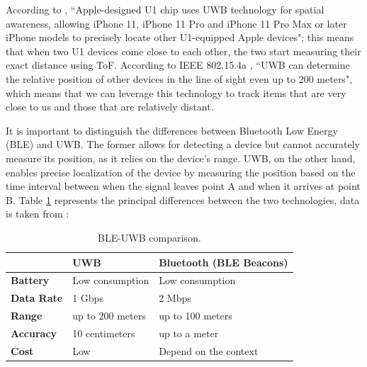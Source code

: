 \documentclass[english]{article}
\begin{document}
According to \cite{aps}, ``Apple-designed U1 chip uses UWB technology for spatial awareness, allowing iPhone 11, iPhone 11 Pro and iPhone 11 Pro Max or later iPhone models to precisely locate other U1-equipped Apple devices"; this means that when two U1 devices come close to each other, the two start measuring their exact distance using ToF. According to IEEE 802.15.4a \cite{5394030}, ``UWB can determine the relative position of other devices in the line of sight even up to 200 meters", which means that we can leverage this technology to track items that are very close to us and those that are relatively distant.

It is important to distinguish the differences between Bluetooth Low Energy (BLE) and UWB. The former allows for detecting a device but cannot accurately measure its position, as it relies on the device's range. UWB, on the other hand, enables precise localization of the device by measuring the position based on the time interval between when the signal leaves point A and when it arrives at point B.
Table \ref{tableu} represents the principal differences between the two technologies, data is taken from \cite{encstore}:
\begin{table}[h] 
\caption{BLE-UWB comparison.}
  \centering
  
    \begin{tabular}{l|l|l|}
      \cline{2-3}
      {}                               & {\textbf{UWB}}                & { \textbf{Bluetooth (BLE Beacons)}} \\ \hline
      \multicolumn{1}{|l|}{{  \textbf{Battery}}}  & {  Low consumption}             & {  Low consumption}                  \\ \hline
      \multicolumn{1}{|l|}{{  \textbf{Data Rate}}}  & { 1 Gbps }             & { 2 Mbps }                  \\ \hline
      \multicolumn{1}{|l|}{{  \textbf{Range}}}    & {  up to 200 meters} & {  up to 100 meters}       \\ \hline
      \multicolumn{1}{|l|}{{  \textbf{Accuracy}}} & {  10 centimeters} & {  up to a meter}                    \\ \hline
      \multicolumn{1}{|l|}{{  \textbf{Cost}}}     & {  Low}                         & {Depend on the context }                              \\ \hline
    \end{tabular}
    \label{tableu}
  \end{table}
\end{document}

